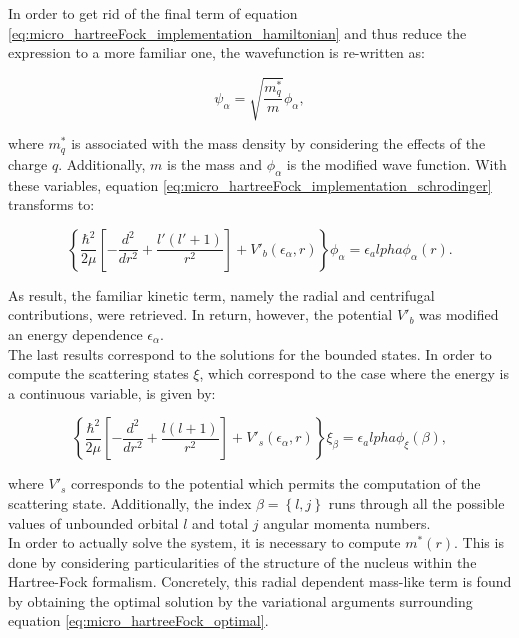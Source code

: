 \documentclass[openany]{book}
\begin{document}
In order to get rid of the final term of equation \ref{eq:micro_hartreeFock_implementation_hamiltonian} and thus reduce the expression to a more familiar one, the wavefunction is re-written as: 

\begin{equation}\label{eq:micro_hartreeFock_implementation_wavefunction_alternative}
	\psi_\alpha = \sqrt{\frac{m^{*}_q}{m}} \phi_\alpha,
\end{equation}

where $m^{*}_q$ is associated with the mass density by considering the effects of the charge $q$. Additionally, $m$ is the mass and $\phi_\alpha$ is the modified wave function. With these variables, equation \ref{eq:micro_hartreeFock_implementation_schrodinger} transforms to:

\begin{equation}\label{eq:micro_hartreeFock_implementation_schrodinger_modified}
	\left \{ \frac{\hbar^2}{2\mu} \left [ - \frac{d^2}{dr^2} + \frac{l'(l'+1)}{r^2} \right] + V'_b(\epsilon_\alpha, r) \right \} \phi_\alpha = \epsilon_alpha \phi_\alpha(r).
\end{equation}

As result, the familiar kinetic term, namely the radial and centrifugal contributions, were retrieved. In return, however, the potential $V'_b$ was modified an energy dependence $\epsilon_\alpha$. \\

The last results correspond to the solutions for the bounded states. In order to compute the scattering states $\xi$, which correspond to the case where the energy is a continuous variable, is given by: 

\begin{equation}\label{eq:micro_hartreeFock_implementation_schrodinger_scattered}
	\left \{ \frac{\hbar^2}{2\mu} \left [ - \frac{d^2}{dr^2} + \frac{l(l+1)}{r^2} \right] + V'_s(\epsilon_\alpha, r) \right \} \xi_\beta = \epsilon_alpha \phi_\xi(\beta),
\end{equation}

where $V'_s$ corresponds to the potential which permits the computation of the scattering state. Additionally, the index $\beta = \left \{ l, j\right \}$ runs through all the possible values of unbounded orbital $l$ and total $j$ angular momenta numbers. \\

In order to actually solve the system, it is necessary to compute $m^{*}(r)$. This is done by considering particularities of the structure of the nucleus within the Hartree-Fock formalism. Concretely, this radial dependent mass-like term is found by obtaining the optimal solution by the variational arguments surrounding equation \ref{eq:micro_hartreeFock_optimal}. \\
\end{document}
